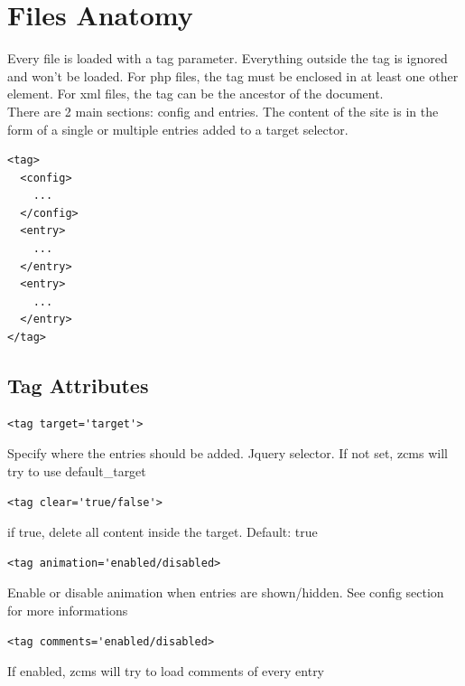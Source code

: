 \documentclass[a4paper,12pt]{article}
\begin{document}
\section{Files Anatomy}
Every file is loaded with a tag parameter. Everything outside the tag is ignored and won't be loaded. For php files, the tag must be enclosed in at least one other element. For xml files, the tag can be the ancestor of the document.\\
There are 2 main sections: config and entries. The content of the site is in the form of a single or multiple entries added to a target selector.\\
\footnotesize
\begin{verbatim}
<tag>
  <config>
    ...
  </config>
  <entry>
    ...
  </entry>
  <entry>
    ...
  </entry>
</tag>
\end{verbatim}
\normalsize
\subsection{Tag Attributes}
\begin{list}{-}{}
\item \begin{verbatim}
<tag target='target'>
      \end{verbatim}
Specify where the entries should be added. Jquery selector. If not set, zcms will try to use default\_target
\item \begin{verbatim}
<tag clear='true/false'>
      \end{verbatim}
if true, delete all content inside the target. Default: true
\item \begin{verbatim}
<tag animation='enabled/disabled>
      \end{verbatim}
Enable or disable animation when entries are shown/hidden. See config section for more informations
\item \begin{verbatim}
<tag comments='enabled/disabled>
      \end{verbatim}
If enabled, zcms will try to load comments of every entry
\end{list}
\end{document}
